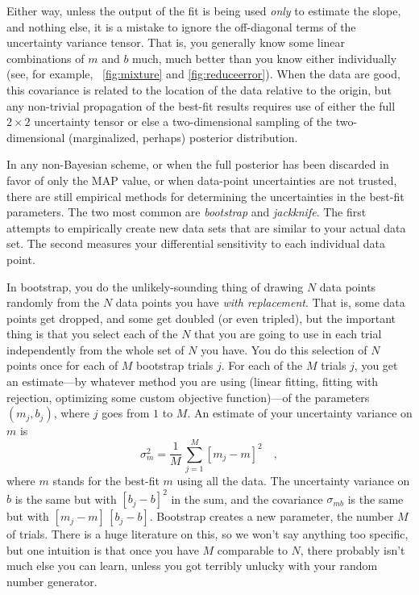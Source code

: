 \documentclass[12pt,twoside,pdftex]{article}
\begin{document}
Either way, unless the output of the fit is being used \emph{only} to
estimate the slope, and nothing else, it is a mistake to ignore the
off-diagonal terms of the uncertainty variance tensor.  That is, you
generally know some linear combinations of $m$ and $b$ much, much
better than you know either individually (see, for example,
\figurenames~\ref{fig:mixture} and \ref{fig:reduceerror}).  When the
data are good, this covariance is related to the location of the data
relative to the origin, but any non-trivial propagation of the
best-fit results requires use of either the full $2\times 2$
uncertainty tensor or else a two-dimensional sampling of the
two-dimensional (marginalized, perhaps) posterior distribution.

In any non-Bayesian scheme, or when the full posterior has been
discarded in favor of only the MAP value, or when data-point
uncertainties are not trusted, there are still empirical methods for
determining the uncertainties in the best-fit parameters.  The two
most common are \emph{bootstrap} and \emph{jackknife}.  The first
attempts to empirically create new data sets that are similar to your
actual data set.  The second measures your differential sensitivity to
each individual data point.

In bootstrap, you do the unlikely-sounding thing of drawing $N$ data
points randomly from the $N$ data points you have \emph{with
  replacement}.  That is, some data points get dropped, and some get
doubled (or even tripled), but the important thing is that you select
each of the $N$ that you are going to use in each trial independently
from the whole set of $N$ you have.  You do this selection of $N$
points once for each of $M$ bootstrap trials $j$.  For each of the $M$
trials $j$, you get an estimate---by whatever method you are using
(linear fitting, fitting with rejection, optimizing some custom
objective function)---of the parameters $(m_j,b_j)$, where $j$ goes
from $1$ to $M$.  An estimate of your uncertainty variance on $m$ is
\begin{equation}
\sigma_m^2 = \frac{1}{M}\,\sum_{j=1}^M [m_j-m]^2 \quad ,
\end{equation}
where $m$ stands for the best-fit $m$ using all the data.  The
uncertainty variance on $b$ is the same but with $[b_j-b]^2$ in the
sum, and the covariance $\sigma_{mb}$ is the same but with
$[m_j-m]\,[b_j-b]$.   Bootstrap
creates a new parameter, the number $M$ of trials.  There is a huge
literature on this, so we won't say anything too specific, but one
intuition is that once you have $M$ comparable to $N$, there probably
isn't much else you can learn, unless you got terribly unlucky with
your random number generator.
\end{document}
